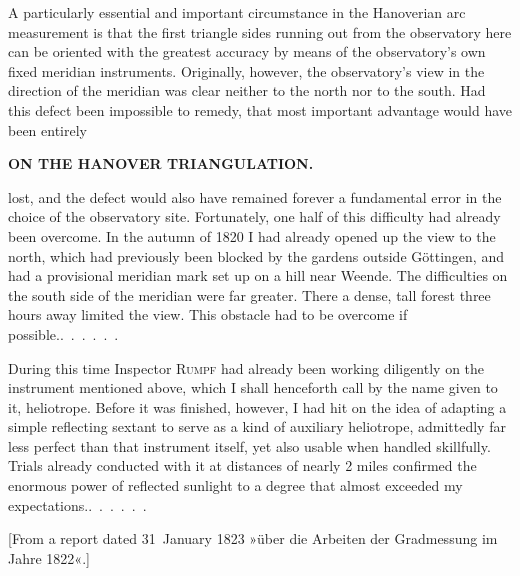 \par\noindent\hspace*{\parindent}A particularly essential and important circumstance in the Hanoverian
arc measurement is that the first triangle sides running out from the observatory
here can be oriented with the greatest accuracy by means of the observatory's
own fixed meridian instruments. Originally, however, the observatory's view
in the direction of the meridian was clear neither to the north nor to the south.
Had this defect been impossible to remedy, that most important advantage would
have been entirely
\par\clearpage

\noindent\null\hfill{\small\textbf{ON THE HANOVER TRIANGULATION.}}\hfill{}\par\medskip
\noindent lost, and the defect would also have remained forever a fundamental
error in the choice of the observatory site. Fortunately, one half of this difficulty
had already been overcome. In the autumn of 1820 I had already opened up
the view to the north, which had previously been blocked by the gardens
outside Göttingen, and had a provisional meridian mark set up on a hill
near Weende. The difficulties on the south side of the meridian were far greater.
There a dense, tall forest three hours away limited the view. This obstacle
had to be overcome if \mbox{possible.\enspace\mbox{.\ .\ .\ .\ .\ .}}

\par\noindent\hspace*{\parindent}During this time Inspector \textsc{Rumpf} had already been working diligently
on the instrument mentioned above, which I shall henceforth call by the name
given to it, heliotrope. Before it was finished, however, I had hit on the idea
of adapting a simple reflecting sextant to serve as a kind of auxiliary heliotrope,
admittedly far less perfect than that instrument itself, yet also usable when
handled skillfully. Trials already conducted with it at distances of nearly
2 miles confirmed the enormous power of reflected sunlight to a degree that
almost exceeded my \mbox{expectations.\enspace\mbox{.\ .\ .\ .\ .\ .}}
\par\bigskip

\begin{center}
[From a report dated 31~January 1823 »über die Arbeiten der Gradmessung im Jahre 1822«.]
\end{center}

